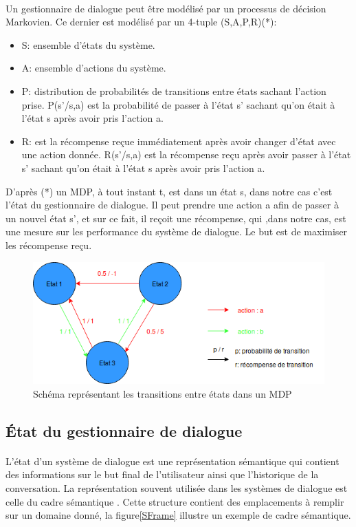 	\paragraph{}Un gestionnaire de dialogue peut être modélisé par un processus de décision Markovien\cite{Bel1957}. Ce dernier est modélisé par un 4-tuple (S,A,P,R)(*):
	\begin{itemize}
		\item S: ensemble d’états du système.
		\item A: ensemble d’actions du système.
		\item P: distribution de probabilités de transitions entre états sachant l’action prise. P(s’/s,a) est la probabilité de passer à l’état s’ sachant qu’on était à l’état s après avoir pris l’action a.
		\item R: est la récompense reçue immédiatement après avoir changer d’état avec une action donnée. R(s’/s,a) est la récompense reçu après avoir passer à l’état s’ sachant qu’on était à l’état s après avoir pris l’action a.
	\end{itemize}
	D’après (*) un MDP, à tout instant t, est dans un état s, dans notre cas c’est l’état du gestionnaire de dialogue. Il peut prendre une action a afin de passer à un nouvel état s’, et sur ce fait, il reçoit une récompense, qui ,dans notre cas, est une mesure sur les performance du système de dialogue. Le but est de maximiser les récompense reçu.
	
	\begin{figure}[H]
		\centering
		\includegraphics[width=.95\linewidth]{images/DM/MDP.png} 
		\caption{Schéma représentant les transitions entre états dans un MDP} 
	\end{figure}
	
	
	\subsection{État du gestionnaire de dialogue}
		\paragraph{}
		L’état d’un système de dialogue est une représentation sémantique qui contient des informations sur le but final de l’utilisateur ainsi que l’historique de la conversation. La représentation souvent utilisée dans les systèmes de dialogue est celle du cadre sémantique \cite{Chen2017}. Cette structure contient des emplacements à remplir sur un domaine donné, la figure\ref{SFrame} illustre un exemple de cadre sémantique.\newline
		
